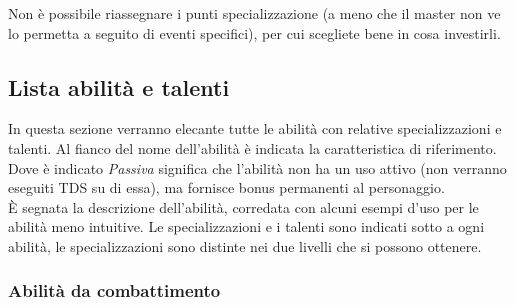 \documentclass[../manuale_main.tex]{subfiles}
\begin{document}
Non è possibile riassegnare i punti specializzazione (a meno che il master non ve lo permetta a seguito di eventi specifici), per cui scegliete bene in cosa investirli.


\subsection{Lista abilità e talenti}

In questa sezione verranno elecante tutte le abilità con relative specializzazioni e talenti.
Al fianco del nome dell'abilità è indicata la caratteristica di riferimento. Dove è indicato \emph{Passiva} significa che l'abilità non ha un uso attivo (non verranno eseguiti TDS su di essa), ma fornisce bonus permanenti al personaggio.\\
È segnata la descrizione dell'abilità, corredata con alcuni esempi d'uso per le abilità meno intuitive.
Le specializzazioni e i talenti sono indicati sotto a ogni abilità, le specializzazioni sono distinte nei due livelli che si possono ottenere.


\subsubsection{Abilità da combattimento}
\end{document}
